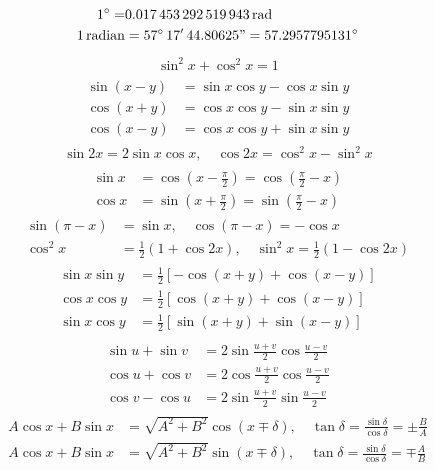 %
\begin{align*}
1^{\circ}=&\SI{0.017453292519943}{\radian}\\
\SI{1}{radian}&=57^\circ\,17'\,44.80625"=57.2957795131^{\circ}
\end{align*}
%
\begin{align}
\sin^2x+\cos^2x=1
\end{align}
%
\begin{gather}
\begin{aligned}
\sin(x-y)&=\sin x\cos y-\cos x\sin y\\
\cos(x+y)&=\cos x\cos y-\sin x\sin y\\
\cos(x-y)&=\cos x\cos y+\sin x\sin y
\end{aligned}
\end{gather}
%
\begin{align}
\sin 2x=2\sin x\cos x, \quad \cos 2x=\cos^2x-\sin^2x
\end{align}
%
\begin{gather}
\begin{aligned}
\sin x&=\cos\left(x-\frac{\pi}{2}\right)=\cos\left(\frac{\pi}{2}-x\right)\\
\cos x&=\sin\left(x+\frac{\pi}{2}\right)=\sin\left(\frac{\pi}{2}-x\right)
\end{aligned}
\end{gather}
%
\begin{align}
\sin(\pi-x)&=\sin x,\quad \cos(\pi-x)=-\cos x\\
\cos^2x&=\frac{1}{2}(1+\cos 2x),\quad \sin^2x=\frac{1}{2}(1-\cos 2x)
\end{align}
%
\begin{gather}
\begin{aligned}\label{مساوات_ضمیمہ_مفید_گیارہ}
\sin x\sin y&=\frac{1}{2}[-\cos(x+y)+\cos(x-y)]\\
\cos x\cos y&=\frac{1}{2}[\cos(x+y)+\cos(x-y)]\\
\sin x\cos y&=\frac{1}{2}[\sin(x+y)+\sin(x-y)]
\end{aligned}
\end{gather}
%
\begin{gather}
\begin{aligned}
\sin u+\sin v&=2\sin \frac{u+v}{2}\cos\frac{u-v}{2}\\
\cos u+\cos v&=2\cos\frac{u+v}{2}\cos\frac{u-v}{2}\\
\cos v-\cos u&=2\sin\frac{u+v}{2}\sin\frac{u-v}{2}
\end{aligned}
\end{gather}
%
\begin{align}
A\cos x+B\sin x&=\sqrt{A^2+B^2}\cos(x\mp\delta),\quad \tan \delta=\frac{\sin \delta}{\cos \delta}=\pm \frac{B}{A}\\
A\cos x+B\sin x &=\sqrt{A^2+B^2}\sin(x\mp\delta),\quad \tan \delta=\frac{\sin \delta}{\cos \delta}=\mp\frac{A}{B}
\end{align}
